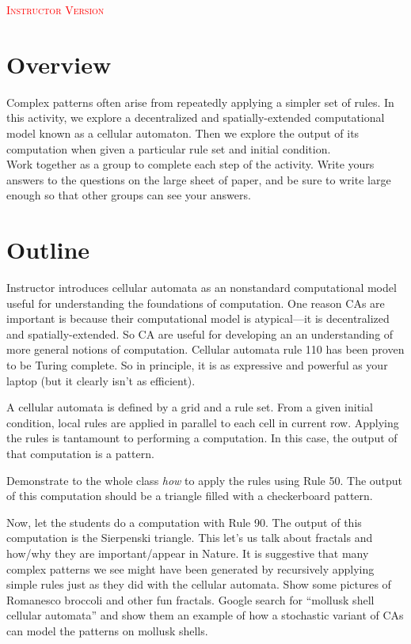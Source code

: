\documentclass{article}
\begin{document}
\noindent\textcolor{red}{\textsc{Instructor Version}}

\section*{Overview}

Complex patterns often arise from repeatedly applying a simpler set of rules.
In this activity, we explore a decentralized and spatially-extended computational model known as a cellular automaton. Then we explore the output of its computation when given a particular rule set and initial condition.\\

\noindent Work together as a group to complete each step of the activity. Write yours answers to the questions on the large sheet of paper, and be sure to write large enough so that other groups can see your answers.

\section*{Outline}
  Instructor introduces cellular automata as an nonstandard computational model useful for understanding the foundations of computation. One reason CAs are important is because their computational model is atypical---it is decentralized and spatially-extended. So CA are useful for developing an an understanding of more general notions of computation. Cellular automata rule 110 has been proven to be Turing complete. So in principle, it is as expressive and powerful as your laptop (but it clearly isn't as efficient).

  A cellular automata is defined by a grid and a rule set. From a given initial condition, local rules are applied in parallel to each cell in current row. Applying the rules is tantamount to performing a computation. In this case, the output of that computation is a pattern.

  Demonstrate to the whole class \emph{how} to apply the rules using Rule 50.
  The output of this computation should be a triangle filled with a checkerboard pattern.

  Now, let the students do a computation with Rule 90. The output of this computation is the Sierpenski triangle. This let's us talk about fractals and how/why they are important/appear in Nature. It is suggestive that many complex patterns we see might have been generated by recursively applying simple rules just as they did with the cellular automata. Show some pictures of Romanesco broccoli and other fun fractals. Google search for ``mollusk shell cellular automata'' and show them an example of how a stochastic variant of CAs can model the patterns on mollusk shells.
\end{document}
